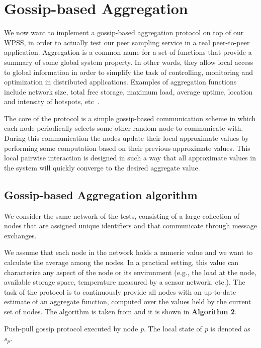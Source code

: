 
\chapter{Gossip-based Aggregation}
\label{cha:aggregation}
We now want to implement a gossip-based aggregation protocol on top of our WPSS, in order to actually test our peer sampling service in a real peer-to-peer application. Aggregation is a common name for a set of functions that provide a summary of some global system property. In other words, they allow local access to global information in order to simplify the task of controlling, monitoring and optimization in distributed applications. Examples of aggregation functions include network size, total free storage, maximum load, average uptime, location and intensity of hotspots, etc~\cite{aggregation}. 

The core of the protocol is a simple gossip-based communication scheme in which each node periodically selects some other random node to communicate with. During this communication the nodes update their local approximate values by performing some computation based on their previous approximate values. This local pairwise interaction is designed in such a way that all approximate values in the system will quickly converge to the desired aggregate value. 

\section{Gossip-based Aggregation algorithm}
We consider the same network of the tests, consisting of a large collection of nodes that are assigned unique identifiers and that communicate through message exchanges. 

We assume that each node in the network holds a numeric value and we want to calculate the average among the nodes. In a practical setting, this value can characterize any aspect of the node or its environment (e.g., the load at the node, available storage space, temperature measured by a sensor network, etc.). The task of the protocol is to continuously provide all nodes with an up-to-date estimate of an aggregate function, computed over the values held by the current set of nodes. The algorithm is taken from \cite{aggregation} and it is shown in \textbf{Algorithm 2}.

\begin{algorithm}[H]




 \caption{Push-pull gossip protocol executed by node \textit{p}. The local state of \textit{p} is denoted as $s_p$.}
\end{algorithm}


